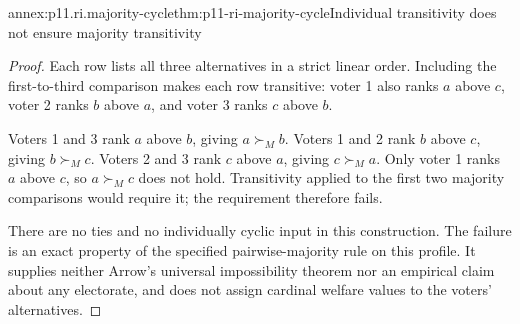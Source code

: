\begin{annexitem}{annex:p11.ri.majority-cycle}{thm:p11-ri-majority-cycle}{Individual transitivity does not ensure majority transitivity}
\begin{proof}
Each row lists all three alternatives in a strict linear order.
Including the first-to-third comparison makes each row transitive:
voter 1 also ranks \(a\) above \(c\), voter 2 ranks \(b\)
above \(a\), and voter 3 ranks \(c\) above \(b\).

Voters 1 and 3 rank \(a\) above \(b\), giving
\(a\succ_M b\). Voters 1 and 2 rank \(b\) above \(c\),
giving \(b\succ_M c\). Voters 2 and 3 rank \(c\) above
\(a\), giving \(c\succ_M a\). Only voter 1 ranks \(a\)
above \(c\), so \(a\succ_M c\) does not hold. Transitivity
applied to the first two majority comparisons would require it;
the requirement therefore fails.

There are no ties and no individually cyclic input in this
construction. The failure is an exact property of the specified
pairwise-majority rule on this profile. It supplies neither
Arrow's universal impossibility theorem nor an empirical claim
about any electorate, and does not assign cardinal welfare
values to the voters' alternatives.
\end{proof}
\end{annexitem}

